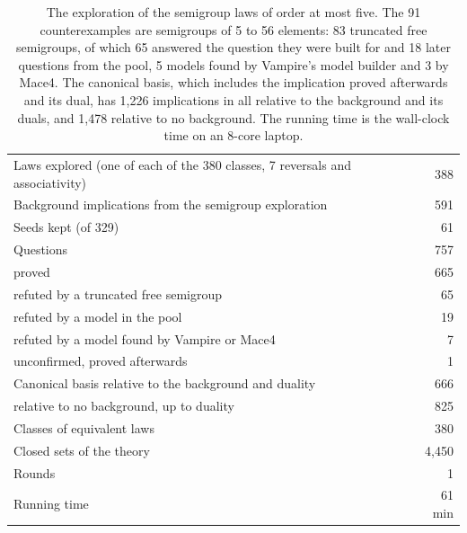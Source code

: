 \documentclass[11pt,a4paper]{article}
\theoremstyle{definition}
\theoremstyle{remark}
\begin{document}
\begin{table}[!htbp]
\centering
\small
\begin{tabularx}{\textwidth}{@{}Xr@{}}
\toprule
Laws explored (one of each of the 380 classes, 7 reversals and associativity) & 388 \\
Background implications from the semigroup exploration & 591 \\
Seeds kept (of 329) & 61 \\
Questions & 757 \\
\quad proved & 665 \\
\quad refuted by a truncated free semigroup & 65 \\
\quad refuted by a model in the pool & 19 \\
\quad refuted by a model found by Vampire or Mace4 & 7 \\
\quad unconfirmed, proved afterwards & 1 \\
Canonical basis relative to the background and duality & 666 \\
\quad relative to no background, up to duality & 825 \\
Classes of equivalent laws & 380 \\
Closed sets of the theory & 4,450 \\
Rounds & 1 \\
Running time & 61 min \\
\bottomrule
\end{tabularx}
\caption{The exploration of the semigroup laws of order at most five. The 91 counterexamples are semigroups of 5 to 56 elements: 83 truncated free semigroups, of which 65 answered the question they were built for and 18 later questions from the pool, 5 models found by Vampire's model builder and 3 by Mace4. The canonical basis, which includes the implication proved afterwards and its dual, has 1,226 implications in all relative to the background and its duals, and 1,478 relative to no background. The running time is the wall-clock time on an 8-core laptop.}\label{tab:semigroups5}
\end{table}
\end{document}
